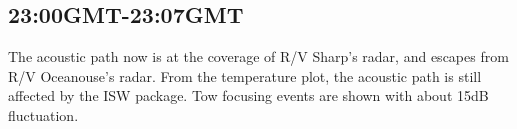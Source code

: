 \subsection{23:00GMT-23:07GMT}
The acoustic path now is at the coverage of R/V Sharp's radar, and
escapes from R/V Oceanouse's radar. From the temperature plot, the
acoustic path is still affected by the ISW package. Tow focusing
events are shown with about 15dB fluctuation.
